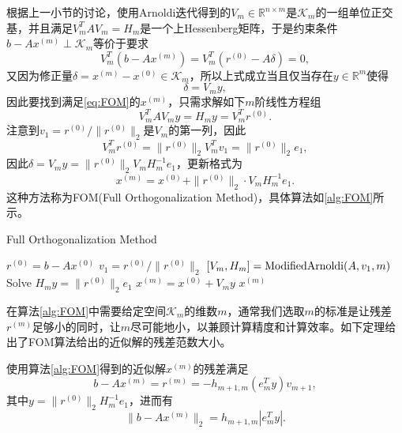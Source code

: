 \documentclass[a4paper,10pt]{ctexart}
\begin{document}
根据上一小节的讨论，使用Arnoldi迭代得到的$ V_m\in \mathbb{R}^{n\times m} $是$ \mathcal{K}_m $的一组单位正交基，并且满足$ V^T_m AV_m = H_m $是一个上Hessenberg矩阵，于是约束条件$ b - Ax^{(m)}\perp \mathcal{K}_m $等价于要求
\[
    V^T_m (b - Ax^{(m)}) = V^T_m (r^{(0)} - A \delta) = 0,
\]
又因为修正量$ \delta = x^{(m)}-x^{(0)}\in \mathcal{K}_m $，所以上式成立当且仅当存在$ y\in \mathbb{R}^m $使得
\[
    \delta = V_m y,
\]
因此要找到满足\eqref{eq:FOM}的$ x^{(m)} $，只需求解如下$ m $阶线性方程组
\begin{equation}
    V^T_m A V_m y = H_m y = V^T_m r^{(0)}.
\end{equation}
注意到$ v_1= r^{(0)} / \| r^{(0)} \|_2 $是$ V_m $的第一列，因此
\[
    V^T_m r^{(0)} = \| r^{(0)} \|_2 V_m^T v_1 = \| r^{(0)} \|_2 e_1,
\]
因此$ \delta = V_m y = \| r^{(0)} \|_2V_m H_m^{-1}e_1 $，更新格式为
\begin{equation}
    x^{(m)} = x^{(0)} + \| r^{(0)} \|_2 \cdot V_m H_m^{-1}e_1 .
\end{equation}
这种方法称为FOM(Full Orthogonalization Method)，具体算法如\ref{alg:FOM}所示。

\begin{algorithm}[htbp]
    \caption{Full Orthogonalization Method}\label{alg:FOM}
    $ r^{(0)} = b - Ax^{(0)} $\;
    $ v_1 = r^{(0)} / \| r^{(0)} \|_2 $\;
    $ [V_m, H_m] = {\rm ModifiedArnoldi}(A,v_1,m) $ 
    Solve $ H_m y = \| r^{(0)} \|_2 e_1 $\;
    $ x^{(m)} = x^{(0)} + V_m y $\;
    \Return $ x^{(m)} $\;
\end{algorithm}

在算法\ref{alg:FOM}中需要给定空间$ \mathcal{K}_m $的维数$ m $，通常我们选取$ m $的标准是让残差$ r^{(m)} $足够小的同时，让$ m $尽可能地小，以兼顾计算精度和计算效率。如下定理给出了FOM算法给出的近似解的残差范数大小。
\begin{theorem}\label{th:FOM}
    使用算法\ref{alg:FOM}得到的近似解$ x^{(m)} $的残差满足
    \begin{equation}
        b - A x^{(m)} = r^{(m)} = -h_{m+1,m}(e^T_m y) v_{m+1},
    \end{equation}
    其中$ y = \| r^{(0)} \|_2 H_m^{-1}e_1 $，进而有
    \begin{equation}
        \| b-Ax^{(m)} \|_2 = h_{m+1,m} |e_m^T y|.
    \end{equation}
\end{theorem}
\end{document}
